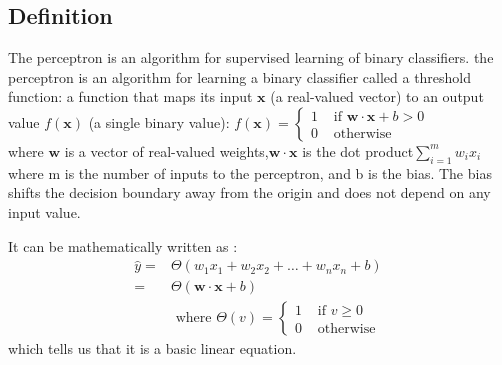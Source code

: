 \documentclass[12pt,times,a4paper]{report}
\begin{document}
{{\begin{normalsize}
\section{Definition}
The perceptron is an algorithm for supervised learning of binary classifiers. the perceptron is an algorithm for learning a binary classifier called a threshold function: a function that maps its input $\mathbf {x}$  (a real-valued vector) to an output value $ f(\mathbf {x} )$ (a single binary value):
$f(\mathbf{x})=\left\{\begin{array}{ll}{1} & {\text { if } \mathbf{w} \cdot \mathbf{x}+b>0} \\ {0} & {\text { otherwise }}\end{array}\right.$\\
where $ \mathbf {w}$  is a vector of real-valued weights,$ {\displaystyle \mathbf {w} \cdot \mathbf {x} }$ is the dot product$ {\displaystyle \sum _{i=1}^{m}w_{i}x_{i}} $where m is the number of inputs to the perceptron, and b is the bias. The bias shifts the decision boundary away from the origin and does not depend on any input value.\cite{DUMMY:1}
\par
It can be mathematically written as :
$$
\begin{aligned} \hat{y}=& \Theta\left(w_{1} x_{1}+w_{2} x_{2}+\ldots+w_{n} x_{n}+b\right) \\=& \Theta(\mathbf{w} \cdot \mathbf{x}+b) \\ & \text { where } \Theta(v)=\left\{\begin{array}{ll}{1} & {\text { if } v \geqslant 0} \\ {0} & {\text { otherwise }}\end{array}\right. \end{aligned}
$$
which tells us that it is a basic linear equation.

\end{normalsize}}}
\end{document}
